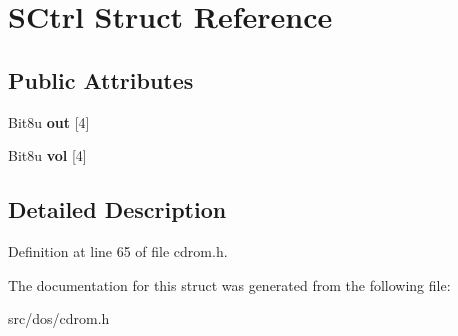 \hypertarget{structSCtrl}{\section{S\-Ctrl Struct Reference}
\label{structSCtrl}
}
\subsection*{Public Attributes}
\begin{DoxyCompactItemize}
\item 
\hypertarget{structSCtrl_a5b5415593005d9a11a35d11e8bbdd8b3}{Bit8u {\bfseries out} \mbox{[}4\mbox{]}}\label{structSCtrl_a5b5415593005d9a11a35d11e8bbdd8b3}

\item 
\hypertarget{structSCtrl_ad029c2b75bd84b09cfe3f893ba6a5004}{Bit8u {\bfseries vol} \mbox{[}4\mbox{]}}\label{structSCtrl_ad029c2b75bd84b09cfe3f893ba6a5004}

\end{DoxyCompactItemize}


\subsection{Detailed Description}


Definition at line 65 of file cdrom.\-h.



The documentation for this struct was generated from the following file\-:\begin{DoxyCompactItemize}
\item 
src/dos/cdrom.\-h\end{DoxyCompactItemize}
